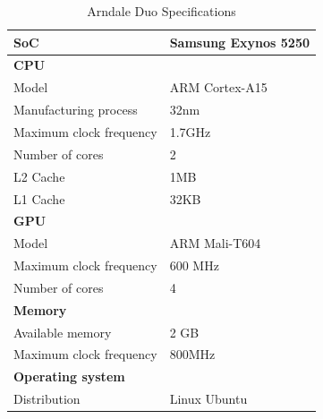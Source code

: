 \begin{table}[h]
  \begin{tabular}{ll}
    \toprule
    \textbf{SoC}              & Samsung Exynos 5250 \\
    \midrule
    \textbf{CPU}              &  \\
    Model                     & ARM Cortex-A15 \\
    Manufacturing process     & 32nm \\
    Maximum clock frequency   & 1.7GHz \\
    Number of cores           & 2 \\
    L2 Cache                  & 1MB \\
    L1 Cache                  & 32KB \\
    \midrule
    \textbf{GPU}              &  \\
    Model                     & ARM Mali-T604 \\
    Maximum clock frequency   & 600 MHz \\
    Number of cores           & 4 \\
    \midrule
    \textbf{Memory}           &  \\
    Available memory          & 2 GB \\
    Maximum clock frequency   & 800MHz \\
    \midrule
    \textbf{Operating system} &  \\
    Distribution              & Linux Ubuntu \\
    \bottomrule
  \end{tabular}
  \caption{Arndale Duo Specifications\label{overflow}}
\end{table}

